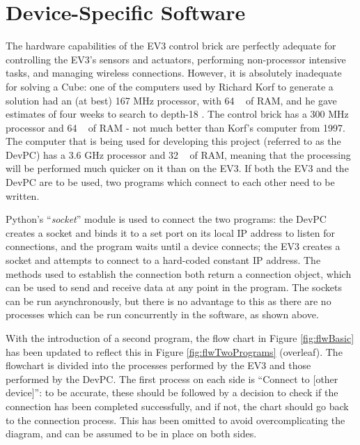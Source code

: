 \documentclass{report}
\newcommand{\tit}[1]{\textit{#1}}
\newcommand{\propernoun}[1]{\enquote{\tit{#1}}}
\newcommand{\depth}[1]{depth-#1}
\begin{document}
    \section{Device-Specific Software}
    
    The hardware capabilities of the EV3 control brick are perfectly adequate for controlling the EV3's sensors and actuators, performing non-processor intensive tasks, and managing wireless connections. However, it is absolutely inadequate for solving a Cube: one of the computers used by Richard Korf to generate a solution had an (at best) 167 \si{\mega\hertz} processor, with 64 \si{\mega\byte} of RAM, and he gave estimates of four weeks to search to \depth{18} \cite{Korf1997}. The control brick has a 300 \si{\mega\hertz} processor and 64 \si{\mega\byte} of RAM - not much better than Korf's computer from 1997. The computer  that is being used for developing this project (referred to as the DevPC) has a 3.6 \si{\giga\hertz} processor and 32 \si{\giga\byte} of RAM, meaning that the processing will be performed much quicker on it than on the EV3. If both the EV3 and the DevPC are to be used, two programs which connect to each other need to be written.
    
    Python's \propernoun{socket} module is used to connect the two programs: the DevPC creates a socket and binds it to a set port on its local IP address to listen for connections, and the program waits until a device connects; the EV3 creates a socket and attempts to connect to a hard-coded constant IP address. The methods used to establish the connection both return a connection object, which can be used to send and receive data at any point in the program. The sockets can be run asynchronously, but there is no advantage to this as there are no processes which can be run concurrently in the software, as shown above.
    
    With the introduction of a second program, the flow chart in Figure \ref{fig:flwBasic} has been updated to reflect this in Figure \ref{fig:flwTwoPrograms} (overleaf). The flowchart is divided into the processes performed by the EV3 and those performed by the DevPC. The first process on each side is \enquote{Connect to [other device]}: to be accurate, these should be followed by a decision to check if the connection has been completed successfully, and if not, the chart should go back to the connection process. This has been omitted to avoid overcomplicating the diagram, and can be assumed to be in place on both sides.
    
\end{document}
